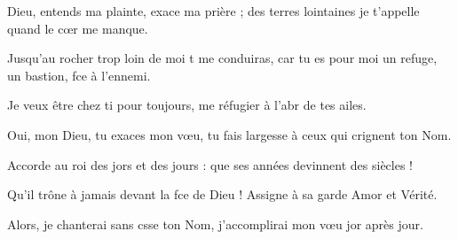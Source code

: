 \item Dieu, entends ma plainte, exace ma prière ; des terres lointaines je t’appelle quand le cœr me manque. 
\item Jusqu’au rocher trop loin de moi t me conduiras, car tu es pour moi un refuge, un bastion, fce à l’ennemi.
\item Je veux être chez ti pour toujours, me réfugier à l’abr de tes ailes.
\item Oui, mon Dieu, tu exaces mon vœu, tu fais largesse à ceux qui crignent ton Nom.
\item Accorde au roi des jors et des jours : que ses années devinnent des siècles !
\item Qu’il trône à jamais devant la fce de Dieu ! Assigne à sa garde Amor et Vérité.
\item Alors, je chanterai sans csse ton Nom, j’accomplirai mon vœu jor après jour.